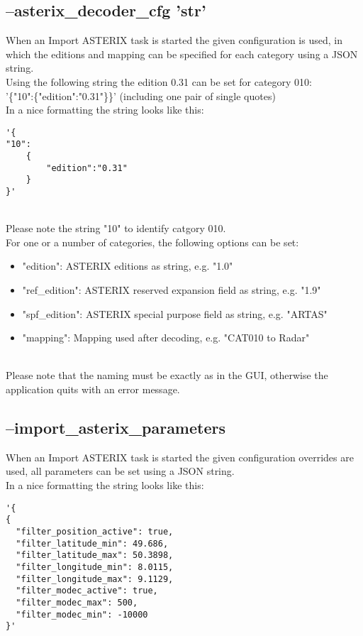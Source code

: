 \subsection{--asterix\_decoder\_cfg 'str'}

When an Import ASTERIX task is started the given configuration is used, in which the editions and mapping can be specified for each category using a JSON string. \\

Using the following string the edition 0.31 can be set for category 010:  \\
'\{"10":\{"edition":"0.31"\}\}' (including one pair of single quotes) \\

In a nice formatting the string looks like this:
\begin{lstlisting}[basicstyle=\small\ttfamily]
'{
"10":
    {
        "edition":"0.31"
    }
}'
\end{lstlisting}
\ \\

Please note the string "10" to identify catgory 010. \\

For one or a number of categories, the following options can be set:

\begin{itemize}
\item "edition":  ASTERIX editions as string, e.g. "1.0"
\item "ref\_edition":  ASTERIX reserved expansion field as string, e.g. "1.9"
\item "spf\_edition": ASTERIX special purpose field as string, e.g. "ARTAS"
\item "mapping": Mapping used after decoding, e.g. "CAT010 to Radar"
\end{itemize}
\ \\

Please note that the naming must be exactly as in the GUI, otherwise the application quits with an error message.

\subsection{--import\_asterix\_parameters}

When an Import ASTERIX task is started the given configuration overrides are used, all parameters can be set using a JSON string. \\

In a nice formatting the string looks like this:
\begin{lstlisting}[basicstyle=\small\ttfamily]
'{
{
  "filter_position_active": true,
  "filter_latitude_min": 49.686,
  "filter_latitude_max": 50.3898,
  "filter_longitude_min": 8.0115,
  "filter_longitude_max": 9.1129,
  "filter_modec_active": true,
  "filter_modec_max": 500,
  "filter_modec_min": -10000
}'
\end{lstlisting}
\ \\

